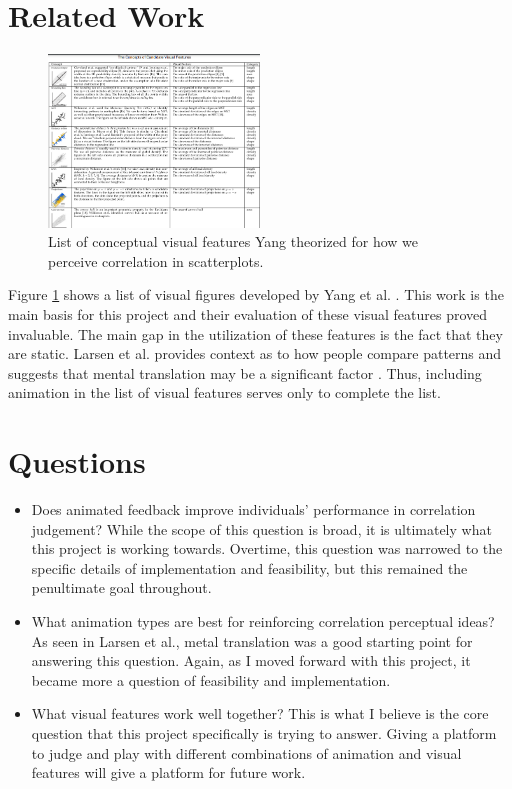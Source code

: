 \documentclass{proc}
\begin{document}
	\section{Related Work}
		\begin{figure}[t]
			\centering
			\includegraphics[width=0.5\textwidth]{concepts}
			\caption{List of conceptual visual features Yang theorized for how we perceive correlation in scatterplots.}
			\label{fig:concepts}
		\end{figure}
		Figure \ref{fig:concepts} shows a list of visual figures developed by Yang et al. \cite{Yang2019}. This work is the main basis for this project and their evaluation of these visual features proved invaluable. The main gap in the utilization of these features is the fact that they are static. Larsen et al. provides context as to how people compare patterns and suggests that mental translation may be a significant factor \cite{larsen1998effects}. Thus, including animation in the list of visual features serves only to complete the list. 
	\section{Questions}
		\begin{itemize}
			\item Does animated feedback improve individuals' performance in correlation judgement?
			\subitem While the scope of this question is broad, it is ultimately what this project is working towards. Overtime, this question was narrowed to the specific details of implementation and feasibility, but this remained the penultimate goal throughout. 
			\item What animation types are best for reinforcing correlation perceptual ideas?
			\subitem As seen in Larsen et al., metal translation was a good starting point for answering this question. Again, as I moved forward with this project, it became more a question of feasibility and implementation.
			\item What visual features work well together?
			\subitem This is what I believe is the core question that this project specifically is trying to answer. Giving a platform to judge and play with different combinations of animation and visual features will give a platform for future work. 
		\end{itemize}
\end{document}
